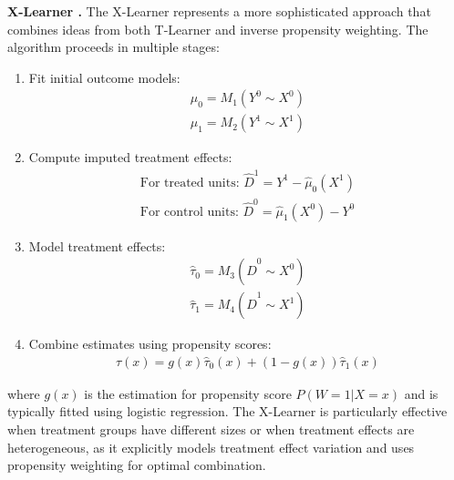 \textbf{X-Learner \citep{ch04:kunzel2019metalearners}.} The X-Learner represents a more sophisticated approach that combines ideas from both T-Learner and inverse propensity weighting. The algorithm proceeds in multiple stages:
\begin{enumerate}
    \item Fit initial outcome models:
        \begin{align*}
            \hat{\mu}_0 = M_1(Y^0 \sim X^0)\\
            \hat{\mu}_1 = M_2(Y^1 \sim X^1)
        \end{align*}
    \item Compute imputed treatment effects:
        \begin{align*}
            \text{For treated units: } \hat{D}^1 = Y^1 - \hat{\mu}_0(X^1) \\
            \text{For control units: } \hat{D}^0 = \hat{\mu}_1(X^0) - Y^0
        \end{align*}
    \item Model treatment effects: 
        \begin{align*}
            \hat{\tau}_0 = M_3(\hat{D}^0 \sim X^0)\\ 
            \hat{\tau}_1 = M_4(\hat{D}^1 \sim X^1)
        \end{align*}
    \item Combine estimates using propensity scores: 
        \begin{align*}
            \hat{\tau}(x) = g(x)\hat{\tau}_0(x) + (1-g(x))\hat{\tau}_1(x)
        \end{align*}
\end{enumerate}
where $g(x)$ is the estimation for propensity score $P(W=1|X=x)$ and is typically fitted using logistic regression.
The X-Learner is particularly effective when treatment groups have different sizes or when treatment effects are heterogeneous, as it explicitly models treatment effect variation and uses propensity weighting for optimal combination.

